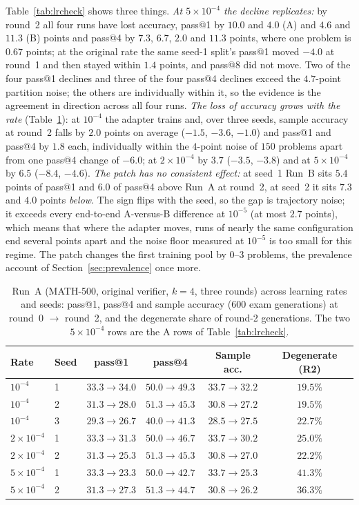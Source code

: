 \documentclass[runningheads]{llncs}
\begin{document}
Table~\ref{tab:lrcheck} shows three things. \emph{At $5\times10^{-4}$ the decline
replicates:} by round~2 all four runs have lost accuracy, pass@1 by $10.0$ and
$4.0$ (A) and $4.6$ and $11.3$ (B) points and pass@4 by $7.3$, $6.7$, $2.0$ and
$11.3$ points, where one problem is $0.67$ points; at the original rate the same
seed-1 split's pass@1 moved $-4.0$ at round~1 and then stayed within $1.4$
points, and pass@8 did not move. Two of the four pass@1 declines and three of
the four pass@4 declines exceed the $4.7$-point partition noise; the others are
individually within it, so the evidence is the agreement in direction across all
four runs. \emph{The loss of accuracy grows with the rate} (Table~\ref{tab:lrseries}): at
$10^{-4}$ the adapter trains and, over three seeds, sample accuracy at round~2
falls by $2.0$ points on average ($-1.5$, $-3.6$, $-1.0$) and pass@1 and pass@4 by
$1.8$ each, individually within the $4$-point noise of $150$ problems apart from
one pass@4 change of $-6.0$; at
$2\times10^{-4}$ by $3.7$ ($-3.5$, $-3.8$) and at $5\times10^{-4}$ by $6.5$ ($-8.4$,
$-4.6$). \emph{The patch has no
consistent effect:} at seed~1 Run~B sits $5.4$ points of pass@1 and $6.0$ of
pass@4 above Run~A at round~2, at seed~2 it sits $7.3$ and $4.0$ points
\emph{below}. The sign flips with the seed, so the gap is trajectory noise; it
exceeds every end-to-end A-versus-B difference at $10^{-5}$ (at most $2.7$
points), which means that where the adapter moves, runs of nearly the same
configuration end several points apart and the noise floor measured at $10^{-5}$
is too small for this regime. The patch changes the first training pool by $0$--$3$
problems, the prevalence account of Section~\ref{sec:prevalence} once more.

\begin{table}[t]
\caption{Run~A (MATH-500, original verifier, $k=4$, three rounds) across learning
rates and seeds: pass@1, pass@4 and sample accuracy (600 exam generations) at
round~0 $\to$ round~2, and the degenerate share of round-2 generations. The two
$5\times10^{-4}$ rows are the A rows of Table~\ref{tab:lrcheck}.}
\label{tab:lrseries}
\centering
\setlength{\tabcolsep}{4pt}
\begin{tabular}{llcccc}
\toprule
Rate & Seed & pass@1 & pass@4 & Sample acc. & Degenerate (R2) \\
\midrule
$10^{-4}$ & 1 & $33.3\to34.0$ & $50.0\to49.3$ & $33.7\to32.2$ & $19.5\%$ \\
$10^{-4}$ & 2 & $31.3\to28.0$ & $51.3\to45.3$ & $30.8\to27.2$ & $19.5\%$ \\
$10^{-4}$ & 3 & $29.3\to26.7$ & $40.0\to41.3$ & $28.5\to27.5$ & $22.7\%$ \\
$2\times10^{-4}$ & 1 & $33.3\to31.3$ & $50.0\to46.7$ & $33.7\to30.2$ & $25.0\%$ \\
$2\times10^{-4}$ & 2 & $31.3\to25.3$ & $51.3\to45.3$ & $30.8\to27.0$ & $22.2\%$ \\
$5\times10^{-4}$ & 1 & $33.3\to23.3$ & $50.0\to42.7$ & $33.7\to25.3$ & $41.3\%$ \\
$5\times10^{-4}$ & 2 & $31.3\to27.3$ & $51.3\to44.7$ & $30.8\to26.2$ & $36.3\%$ \\
\bottomrule
\end{tabular}
\end{table}
\end{document}

